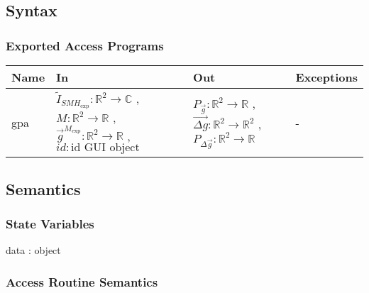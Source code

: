 \documentclass[12pt, titlepage]{article}
\begin{document}
\subsection{Syntax}

\subsubsection{Exported Access Programs}

\begin{center}
\begin{tabular}{p{2cm} p{4cm} p{4cm} p{2cm}}
\hline
\textbf{Name} & \textbf{In} & \textbf{Out} & \textbf{Exceptions} \\
\hline
gpa & $\widetilde{I}_{\mathit{SMH}_{\text{exp}}}:\mathbb{R}^2\rightarrow\mathbb{C}$ , $M:\mathbb{R}^2\rightarrow\mathbb{R}$ , $\overrightarrow{g}^{M_{\text{exp}}} :\mathbb{R}^2\rightarrow\mathbb{R}$ , $id : \text{id GUI object}$ & $P_{\vec{g}}:\mathbb{R}^2\rightarrow\mathbb{R}$ , $\overrightarrow{\Delta g}:\mathbb{R}^2\rightarrow\mathbb{R}^2$ , $P_{\Delta \vec{g}}:\mathbb{R}^2\rightarrow\mathbb{R}$ & - \\
\hline
\end{tabular}
\end{center}

\subsection{Semantics}

\subsubsection{State Variables}

data : object

\subsubsection{Access Routine Semantics}
\end{document}
